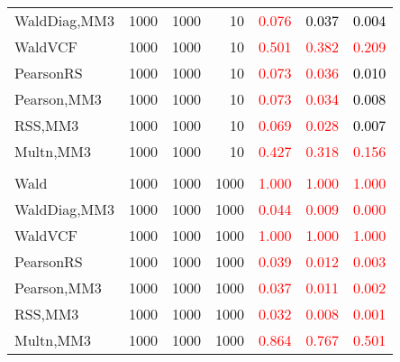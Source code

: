 \documentclass[
]{article}
\begin{document}
\begin{table}[H]
{\begin{tabular}[t]{lrrrrrr}
\hspace{1em}WaldDiag,MM3 & 1000 & 1000 & 10 & \textcolor{red}{0.076} & \textcolor{black}{0.037} & \textcolor{black}{0.004}\\
\hspace{1em}WaldVCF & 1000 & 1000 & 10 & \textcolor{red}{0.501} & \textcolor{red}{0.382} & \textcolor{red}{0.209}\\
\hspace{1em}PearsonRS & 1000 & 1000 & 10 & \textcolor{red}{0.073} & \textcolor{red}{0.036} & \textcolor{black}{0.010}\\
\hspace{1em}Pearson,MM3 & 1000 & 1000 & 10 & \textcolor{red}{0.073} & \textcolor{red}{0.034} & \textcolor{black}{0.008}\\
\hspace{1em}RSS,MM3 & 1000 & 1000 & 10 & \textcolor{red}{0.069} & \textcolor{red}{0.028} & \textcolor{black}{0.007}\\
\hspace{1em}Multn,MM3 & 1000 & 1000 & 10 & \textcolor{red}{0.427} & \textcolor{red}{0.318} & \textcolor{red}{0.156}\\
\addlinespace[0.3em]
\multicolumn{7}{l}{\textbf{1F 15V}}\\
\hspace{1em}Wald & 1000 & 1000 & 1000 & \textcolor{red}{1.000} & \textcolor{red}{1.000} & \vphantom{1} \textcolor{red}{1.000}\\
\hspace{1em}WaldDiag,MM3 & 1000 & 1000 & 1000 & \textcolor{red}{0.044} & \textcolor{red}{0.009} & \textcolor{red}{0.000}\\
\hspace{1em}WaldVCF & 1000 & 1000 & 1000 & \textcolor{red}{1.000} & \textcolor{red}{1.000} & \vphantom{1} \textcolor{red}{1.000}\\
\hspace{1em}PearsonRS & 1000 & 1000 & 1000 & \textcolor{red}{0.039} & \textcolor{red}{0.012} & \textcolor{red}{0.003}\\
\hspace{1em}Pearson,MM3 & 1000 & 1000 & 1000 & \textcolor{red}{0.037} & \textcolor{red}{0.011} & \textcolor{red}{0.002}\\
\hspace{1em}RSS,MM3 & 1000 & 1000 & 1000 & \textcolor{red}{0.032} & \textcolor{red}{0.008} & \textcolor{red}{0.001}\\
\hspace{1em}Multn,MM3 & 1000 & 1000 & 1000 & \textcolor{red}{0.864} & \textcolor{red}{0.767} & \textcolor{red}{0.501}\\

\end{tabular}}
\end{table}
\end{document}
